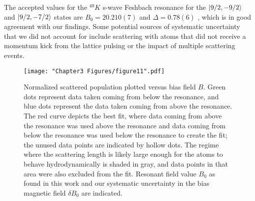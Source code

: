 The accepted values for the $^{40}K$ s-wave Feshbach resonance for the  $\mathinner{|{9/2,-9/2}\rangle}$ and $\mathinner{|{9/2,-7/2}\rangle}$ states are $B_0=20.210(7)$  \mT{} and $\Delta=0.78(6)$  \mT{} \cite{Regal04}, which is in good agreement with our findings. Some potential sources of systematic uncertainty that we did not account for include scattering with atoms that did not receive a momentum kick from the lattice pulsing or the impact of multiple scattering events.
\begin{figure}
	\texttt{[image: "Chapter3 Figures/figure11".pdf]}
\caption{Normalized scattered population plotted versus bias field $B$. Green dots represent data taken coming from below the resonance, and blue dots represent the data taken coming from above the resonance. The red curve depicts the best fit, where data coming from above the resonance was used above the resonance and data coming from below the resonance was used below the resonance to create the fit; the unused data points are indicated by hollow dots. The regime where the scattering length is likely large enough for the atoms to behave hydrodynamically is shaded in gray, and data points in that area were also excluded from the fit. Resonant field value $B_0$ as found in this work and our systematic uncertainty in the bias magnetic field $\delta B_0$ are indicated.    }
\label{fig:fittedFractions}
\end{figure}

